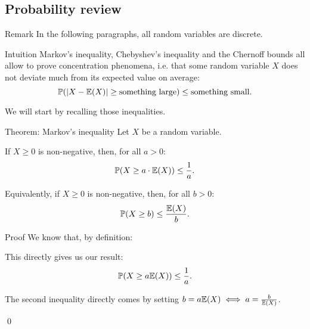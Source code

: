 \documentclass[a4paper]{article}
\begin{document}
\subsection{Probability review}

\begin{parag}{Remark}
    In the following paragraphs, all random variables are discrete.
\end{parag}

\begin{parag}{Intuition}
    Markov's inequality, Chebyshev's inequality and the Chernoff bounds all allow to prove concentration phenomena, i.e. that some random variable $X$ does not deviate much from its expected value on average: 
    \[\prob\left(\left|X - \exval\left(X\right)\right| \geq \text{something large}\right) \leq \text{something small}.\]

    We will start by recalling those inequalities.
\end{parag}

\begin{parag}{Theorem: Markov's inequality}
    Let $X$ be a random variable. 

    If $X \geq 0$ is non-negative, then, for all $a > 0$: 
    \[\prob\left(X \geq a\cdot \exval\left(X\right)\right) \leq \frac{1}{a}.\]

    Equivalently, if $X \geq 0$ is non-negative, then, for all $b > 0$: 
    \[\prob\left(X \geq b\right) \leq \frac{\exval\left(X\right)}{b}.\]

    \begin{subparag}{Proof}
        We know that, by definition: 

        This directly gives us our result: 
        \[\prob\left(X \geq a \exval\left(X\right)\right) \leq \frac{1}{a}.\]

        The second inequality directly comes by setting $b = a \exval\left(X\right) \iff a = \frac{b}{\exval\left(X\right)}$.

        \qed
    \end{subparag}
\end{parag}
\end{document}
